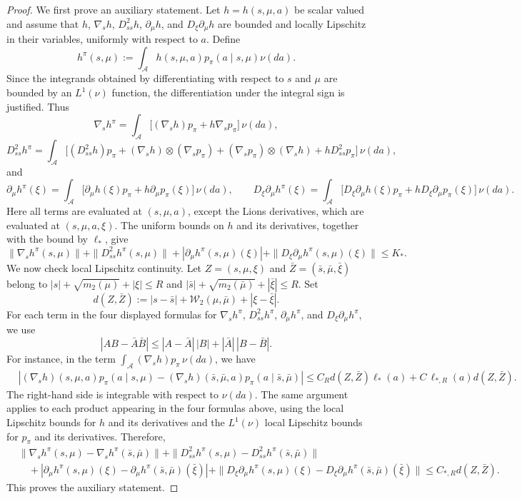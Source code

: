 \documentclass[a4paper, 10pt, english, reqno]{amsart}
\begin{document}
\begin{proof}
We first prove an auxiliary statement. Let $h=h(s,\mu,a)$ be scalar
valued and assume that $h$, $\nabla_s h$, $D_{ss}^2h$, $\partial_\mu h$,
and $D_\xi\partial_\mu h$ are bounded and locally Lipschitz in their
variables, uniformly with respect to $a$. Define
\[
h^\pi(s,\mu):=\int_{\mathcal A}h(s,\mu,a)p_\pi(a\mid s,\mu)\nu(da).
\]
Since the integrands obtained by differentiating with respect to $s$ and
$\mu$ are bounded by an $L^1(\nu)$ function, the differentiation under
the integral sign is justified. Thus
\[
\nabla_s h^\pi
=
\int_{\mathcal A}
\bigl[
(\nabla_s h)p_\pi+h\nabla_s p_\pi
\bigr]\,\nu(da),
\]
\[
D_{ss}^2h^\pi
=
\int_{\mathcal A}
\bigl[
(D_{ss}^2h)p_\pi
+(\nabla_s h)\otimes(\nabla_s p_\pi)
+(\nabla_s p_\pi)\otimes(\nabla_s h)
+hD_{ss}^2p_\pi
\bigr]\,\nu(da),
\]
and
\[
\partial_\mu h^\pi(\xi)
=
\int_{\mathcal A}
\bigl[
\partial_\mu h(\xi)p_\pi
+h\partial_\mu p_\pi(\xi)
\bigr]\,\nu(da),
\qquad
D_\xi\partial_\mu h^\pi(\xi)
=
\int_{\mathcal A}
\bigl[
D_\xi\partial_\mu h(\xi)p_\pi
+hD_\xi\partial_\mu p_\pi(\xi)
\bigr]\,\nu(da).
\]
Here all terms are evaluated at $(s,\mu,a)$, except the Lions
derivatives, which are evaluated at $(s,\mu,a,\xi)$. The uniform bounds
on $h$ and its derivatives, together with the bound by $\ell_*$, give
\[
\|\nabla_s h^\pi(s,\mu)\|
+\|D_{ss}^2h^\pi(s,\mu)\|
+|\partial_\mu h^\pi(s,\mu)(\xi)|
+\|D_\xi\partial_\mu h^\pi(s,\mu)(\xi)\|
\le K_* .
\]
We now check local Lipschitz continuity. Let
$Z=(s,\mu,\xi)$ and $\bar Z=(\bar s,\bar\mu,\bar\xi)$ belong to
$|s|+\sqrt{m_2(\mu)}+|\xi|\le R$ and
$|\bar s|+\sqrt{m_2(\bar\mu)}+|\bar\xi|\le R$. Set
\[
d(Z,\bar Z):=
|s-\bar s|+\mathcal W_2(\mu,\bar\mu)+|\xi-\bar\xi|.
\]
For each term in the four displayed formulas for
$\nabla_s h^\pi$, $D_{ss}^2h^\pi$, $\partial_\mu h^\pi$, and
$D_\xi\partial_\mu h^\pi$, we use
\[
|AB-\bar A\bar B|
\le |A-\bar A|\,|B|+|\bar A|\,|B-\bar B|.
\]
For instance, in the term
$\int_{\mathcal A}(\nabla_s h)p_\pi\,\nu(da)$, we have
\[
\begin{aligned}
&\left|
(\nabla_s h)(s,\mu,a)p_\pi(a\mid s,\mu)
-
(\nabla_s h)(\bar s,\bar\mu,a)p_\pi(a\mid \bar s,\bar\mu)
\right|\le
C_R d(Z,\bar Z)\ell_*(a)
+
C\,\ell_{*,R}(a)d(Z,\bar Z).
\end{aligned}
\]
The right-hand side is integrable with respect to $\nu(da)$. The same
argument applies to each product appearing in the four formulas above,
using the local Lipschitz bounds for $h$ and its derivatives and the
$L^1(\nu)$ local Lipschitz bounds for $p_\pi$ and its derivatives.
Therefore,
\[
\begin{aligned}
&\|\nabla_s h^\pi(s,\mu)-\nabla_s h^\pi(\bar s,\bar\mu)\|
+\|D_{ss}^2h^\pi(s,\mu)-D_{ss}^2h^\pi(\bar s,\bar\mu)\|
\\
&\quad
+|\partial_\mu h^\pi(s,\mu)(\xi)
-\partial_\mu h^\pi(\bar s,\bar\mu)(\bar\xi)|
+\|D_\xi\partial_\mu h^\pi(s,\mu)(\xi)
-D_\xi\partial_\mu h^\pi(\bar s,\bar\mu)(\bar\xi)\|\le C_{*,R}d(Z,\bar Z).
\end{aligned}
\]
This proves the auxiliary statement.


\end{proof}
\end{document}

